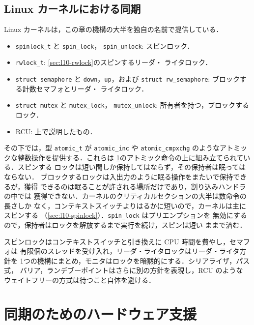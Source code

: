 \documentclass[../main.tex]{subfiles}
\begin{document}
\subsection{Linux カーネルにおける同期}
\label{sec:l10-linux}

Linux カーネルは，この章の機構の大半を独自の名前で提供している．%
\begin{itemize}
  \item \texttt{spinlock\_t} と \texttt{spin\_lock}，
    \texttt{spin\_unlock}: スピンロック．
  \item \texttt{rwlock\_t}: \cref{sec:l10-rwlock}のスピンするリーダ・
    ライタロック．
  \item \texttt{struct semaphore} と \texttt{down}，\texttt{up}，および
    \texttt{struct rw\_semaphore}: ブロックする計数セマフォとリーダ・
    ライタロック．
  \item \texttt{struct mutex} と \texttt{mutex\_lock}，
    \texttt{mutex\_unlock}: 所有者を持つ，ブロックするロック．
  \item RCU: 上で説明したもの．
\end{itemize}
\begin{sloppypar}\noindent
その下では，型 \texttt{atomic\_t} が \texttt{atomic\_\allowbreak inc} や
\texttt{atomic\_\allowbreak cmpxchg} のようなアトミックな整数操作を提供する．これらは
\cref{sec:l10-hw}のアトミック命令の上に組み立てられている．スピンする
ロックは短い間しか保持してはならず，その保持者は眠ってはならない．
ブロックするロックは入出力のように眠る操作をまたいで保持できるが，獲得
できるのは眠ることが許される場所だけであり，割り込みハンドラの中では
獲得できない．カーネルのクリティカルセクションの大半は数命令の長さしか
なく，コンテキストスイッチよりはるかに短いので，カーネルは主にスピンする
（\cref{sec:l10-spinlock}）．\texttt{spin\_lock} はプリエンプションを
無効にするので，保持者はロックを解放するまで実行を続け，スピンは短い
ままで済む．
\end{sloppypar}

\begin{keypoint}
  スピンロックはコンテキストスイッチと引き換えに CPU 時間を費やし，セマフォは
  有限個のスレッドを受け入れ，リーダ・ライタロックはリーダ・ライタ方針を
  1つの機構にまとめ，モニタはロックを暗黙的にする．シリアライザ，パス式，
  バリア，ランデブーポイントはさらに別の方針を表現し，RCU のような
  ウェイトフリーの方式は待つこと自体を避ける．
\end{keypoint}

\section{同期のためのハードウェア支援}
\label{sec:l10-hw}
\end{document}
